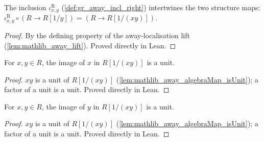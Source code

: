 \begin{lemma}

  \label{lem:gr_awayInclRight_comp_algebraMap}
  The inclusion \(\iota^{\mathrm{R}}_{x,y}\) (\cref{def:gr_away_incl_right})
  intertwines the two structure maps:
  \(\iota^{\mathrm{R}}_{x,y} \circ (R \to R[1/y]) = (R \to R[1/(xy)])\).
\end{lemma}
\begin{proof}

\leanok
  By the defining property of the away-localisation lift
  (\cref{lem:mathlib_away_lift}). Proved directly in Lean.
\end{proof}

\begin{lemma}

  \label{lem:gr_isUnit_algebraMap_away_left}
  For \(x, y \in R\), the image of \(x\) in \(R[1/(xy)]\) is a unit.
\end{lemma}
\begin{proof}

\leanok
  \(xy\) is a unit of \(R[1/(xy)]\)
  (\cref{lem:mathlib_away_algebraMap_isUnit}); a factor of a unit is a unit.
  Proved directly in Lean.
\end{proof}

\begin{lemma}

  \label{lem:gr_isUnit_algebraMap_away_right}
  For \(x, y \in R\), the image of \(y\) in \(R[1/(xy)]\) is a unit.
\end{lemma}
\begin{proof}

\leanok
  \(xy\) is a unit of \(R[1/(xy)]\)
  (\cref{lem:mathlib_away_algebraMap_isUnit}); a factor of a unit is a unit.
  Proved directly in Lean.
\end{proof}

